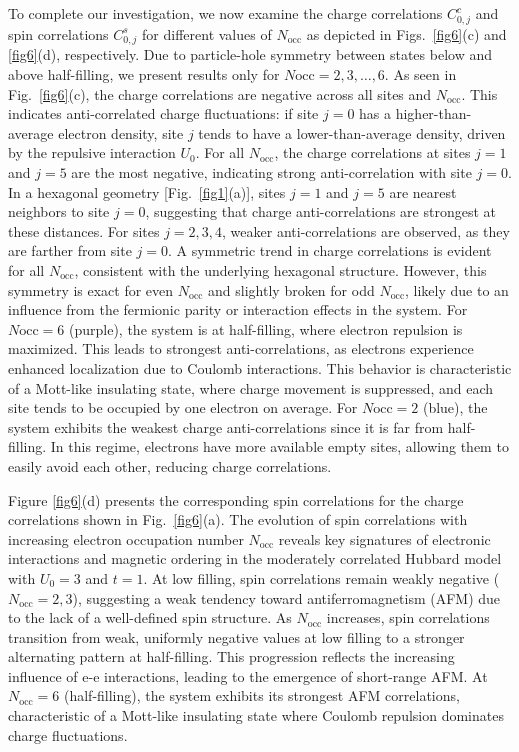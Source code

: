 \documentclass[twocolumn,superscriptaddress,amsmath,amssymb,showpacs,floatfix,preprintnumbers]{revtex4-1}
\newcommand{\mr}{\mathrm}
\begin{document}
To complete our investigation, we now examine the charge correlations $C_{0,j}^c$ and spin
correlations $C_{0,j}^s$ for different values of 
$N_\mr{occ}$ as depicted in Figs.~\ref{fig6}(c) and \ref{fig6}(d), respectively.
%
Due to particle-hole symmetry between states below and above half-filling, we present results only for
$N\mr{occ} = 2,3, \ldots, 6$.
%
As seen in Fig.~\ref{fig6}(c), the charge correlations are negative across all sites and $N_\mr{occ}$.
%
This indicates anti-correlated charge fluctuations: if site $j=0$ has a higher-than-average electron
density, site $j$ tends to have a lower-than-average density, driven by the repulsive interaction 
$U_0$.
%
For all $N_\mr{occ}$, the charge correlations at sites $j=1$ and $j=5$ are the most negative, indicating 
strong anti-correlation with site $j=0$.
%
In a hexagonal geometry [Fig.~\ref{fig1}(a)], sites $j=1$ and $j=5$ are nearest neighbors to site $j=0$, suggesting
that charge anti-correlations are strongest at these distances.
%
For sites $j=2,3,4$, weaker anti-correlations are observed, as they are farther from site $j=0$.
%
A symmetric trend in charge correlations is evident for all $N_\mr{occ}$, consistent with 
the underlying hexagonal structure.
%
However, this symmetry is exact for even $N_\mr{occ}$ and slightly broken for odd $N_\mr{occ}$, likely due to 
an influence from the fermionic parity or interaction effects in the system.
%
For $N\mr{occ}=6$ (purple), the system is at half-filling, where electron repulsion is maximized. 
%
This leads to strongest anti-correlations, as electrons experience enhanced localization due to Coulomb
interactions. 
%
This behavior is characteristic of a Mott-like insulating state, where charge movement is suppressed, 
and each site tends to be occupied by one electron on average.
%
For $N\mr{occ}=2$ (blue), the system exhibits the weakest charge anti-correlations since it is far from 
half-filling. 
%
In this regime, electrons have more available empty sites, allowing them to easily avoid each other, 
reducing charge correlations.

Figure \ref{fig6}(d) presents the corresponding spin correlations for the charge correlations shown 
in Fig.~\ref{fig6}(a).
%
The evolution of spin correlations with increasing electron occupation number $N_\mr{occ}$
reveals key signatures of electronic interactions and magnetic ordering in the moderately correlated 
Hubbard model with $U_0=3$ and $t=1$.
%
At low filling, spin correlations remain weakly negative ($N_\mr{occ}=2,3$), suggesting a weak tendency 
toward antiferromagnetism (AFM) due to the lack of a well-defined spin structure.
%
As $N_\mr{occ}$ increases, spin correlations transition from weak, uniformly negative values at low 
filling to a stronger alternating pattern at half-filling. 
%
This progression reflects the increasing influence of e-e interactions, leading to the emergence of
short-range AFM. 
%
At $N_\mr{occ}=6$ (half-filling), the system exhibits its strongest AFM correlations, characteristic of 
a Mott-like insulating state where Coulomb repulsion dominates charge fluctuations.
\end{document}
